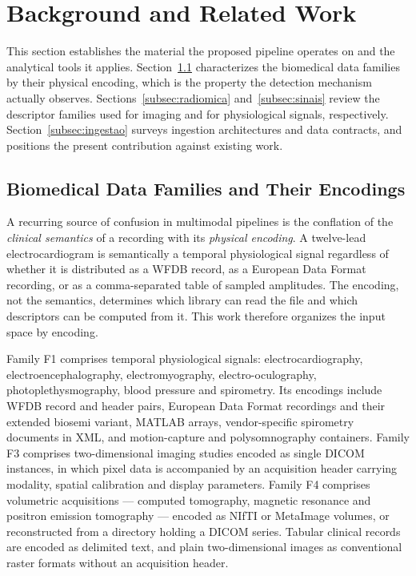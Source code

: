 
\section{Background and Related Work}
\label{sec:fundamentacao}

This section establishes the material the proposed pipeline operates on and the analytical tools it
applies. Section~\ref{subsec:familias} characterizes the biomedical data families by their physical
encoding, which is the property the detection mechanism actually observes.
Sections~\ref{subsec:radiomica} and~\ref{subsec:sinais} review the descriptor families used for
imaging and for physiological signals, respectively. Section~\ref{subsec:ingestao} surveys ingestion
architectures and data contracts, and positions the present contribution against existing work.

\subsection{Biomedical Data Families and Their Encodings}
\label{subsec:familias}

A recurring source of confusion in multimodal pipelines is the conflation of the \emph{clinical
semantics} of a recording with its \emph{physical encoding}. A twelve-lead electrocardiogram is
semantically a temporal physiological signal regardless of whether it is distributed as a WFDB
record, as a European Data Format recording, or as a comma-separated table of sampled amplitudes.
The encoding, not the semantics, determines which library can read the file and which descriptors
can be computed from it. This work therefore organizes the input space by encoding.

Family F1 comprises temporal physiological signals: electrocardiography, electroencephalography,
electromyography, electro-oculography, photoplethysmography, blood pressure and spirometry. Its
encodings include WFDB record and header pairs, European Data Format recordings and their extended
biosemi variant, MATLAB arrays, vendor-specific spirometry documents in XML, and motion-capture and
polysomnography containers. Family F3 comprises
two-dimensional imaging studies encoded as single DICOM instances, in which pixel data is
accompanied by an acquisition header carrying modality, spatial calibration and display
parameters. Family F4 comprises volumetric acquisitions --- computed
tomography, magnetic resonance and positron emission tomography --- encoded as NIfTI or MetaImage
volumes, or reconstructed from a directory holding a DICOM series.
Tabular clinical records are encoded as delimited text, and plain two-dimensional images as
conventional raster formats without an acquisition header.

